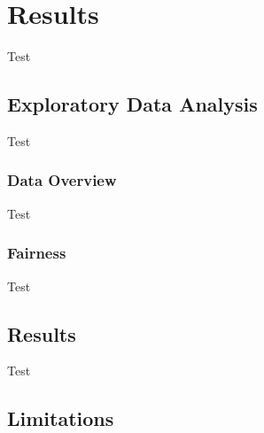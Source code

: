 \chapter{Results}\label{chap:Results}

Test

\section{Exploratory Data Analysis}\label{sec:Exploratory_Data_Analysis}

Test

\subsection{Data Overview}\label{subsec:Data_Overview}

Test

\subsection{Fairness}\label{susec:Fairness}

Test

\section{Results}\label{sec:Results}        

Test

\section{Limitations}\label{sec:Limitations}